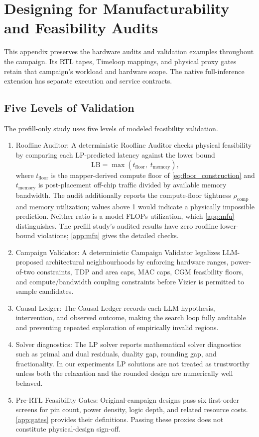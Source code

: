\newpage
\section{Designing for Manufacturability and Feasibility Audits}
\label{app:details}
This appendix preserves the hardware audits and validation examples throughout the campaign.
Its RTL tapes, Timeloop mappings, and physical proxy gates retain that campaign's workload and hardware scope.
The native full-inference extension has separate execution and service contracts.


\subsection{Five Levels of Validation}
\label{app:validation}
The prefill-only study uses five levels of modeled feasibility validation.

\begin{enumerate}
    \item Roofline Auditor: A deterministic Roofline Auditor checks physical feasibility by comparing
each LP-predicted latency against the lower bound
\begin{equation}
    \mathrm{LB} = \max\!\left(t_{\mathrm{floor}},\;
    t_{\mathrm{memory}}\right),
\end{equation}
where $t_{\mathrm{floor}}$ is the mapper-derived compute floor of \cref{eq:floor_construction} and $t_{\mathrm{memory}}$ is post-placement off-chip traffic divided by available memory bandwidth.
The audit additionally reports the compute-floor tightness $\rho_{\mathrm{comp}}$ and memory utilization; values above 1 would indicate a physically impossible prediction.
Neither ratio is a model FLOPs utilization, which \cref{app:mfu} distinguishes.
The prefill study's audited results have zero roofline lower-bound violations; \cref{app:mfu} gives the detailed checks.

\item Campaign Validator: A deterministic Campaign Validator legalizes LLM-proposed architectural
neighbourhoods by enforcing hardware ranges, power-of-two constraints, TDP and area caps, MAC caps, CGM feasibility floors, and compute/bandwidth coupling constraints before Vizier is permitted to sample candidates.
\item Causal Ledger:
The Causal Ledger records each LLM hypothesis, intervention, and observed outcome, making the search loop fully auditable and preventing repeated exploration of empirically invalid regions.
\item Solver diagnostics:
The LP solver reports mathematical solver diagnostics such as primal and dual residuals, duality gap, rounding gap, and fractionality.
In our experiments LP solutions are not treated as trustworthy unless both the relaxation and the rounded design are numerically well behaved.
\item Pre-RTL Feasibility Gates: Original-campaign designs pass six first-order
screens for pin count, power density, logic depth, and related resource costs.
\cref{app:gates} provides their definitions.
Passing these proxies does not constitute physical-design sign-off.
\end{enumerate}


